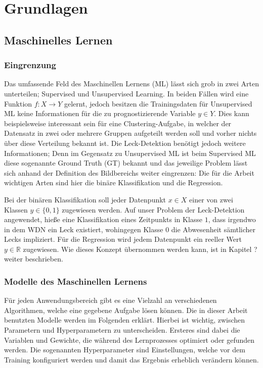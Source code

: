 \chapter{Grundlagen}

\section{Maschinelles Lernen}

\subsection*{Eingrenzung}

Das umfassende Feld des Maschinellen Lernens (ML) lässt sich grob in zwei Arten unterteilen;
 Supervised und Unsupervised Learning. In beiden Fällen wird eine Funktion $f: X \rightarrow Y$ gelernt,
 jedoch besitzen die Trainingsdaten für Unsupervised ML keine Informationen für die zu prognostizierende
 Variable $y \in Y$. Dies kann beispielsweise interessant sein für eine Clustering-Aufgabe, in welcher der
 Datensatz in zwei oder mehrere Gruppen aufgeteilt werden soll und vorher nichts über diese Verteilung bekannt
 ist. Die Leck-Detektion benötigt jedoch weitere Informationen; Denn im Gegensatz zu Unsupervised ML ist beim
 Supervised ML diese sogenannte Ground Truth (GT) bekannt und das jeweilige Problem lässt sich anhand der
 Definition des Bildbereichs weiter eingrenzen: Die für die Arbeit wichtigen Arten sind hier die binäre
 Klassifikation und die Regression.

Bei der binären Klassifikation soll jeder Datenpunkt $x \in X$ einer von zwei Klassen $y \in \{0, 1\}$ zugewiesen
 werden. Auf unser Problem der Leck-Detektion angewendet, hieße eine Klassifikation eines Zeitpunkts in
 Klasse $1$, dass irgendwo in dem WDN ein Leck existiert, wohingegen Klasse $0$ die Abwesenheit sämtlicher
 Lecks impliziert. Für die Regression wird jedem Datenpunkt ein reeller Wert $y \in \mathbb{R}$ zugewiesen.
Wie dieses Konzept übernommen werden kann, ist in Kapitel ? weiter beschrieben. 


\subsection*{Modelle des Maschinellen Lernens}

Für jeden Anwendungsbereich gibt es eine Vielzahl an verschiedenen Algorithmen, welche eine gegebene Aufgabe
 lösen können. Die in dieser Arbeit benutzten Modelle werden im Folgenden erklärt. Hierbei ist wichtig, zwischen
 Parametern und Hyperparametern zu unterscheiden. Ersteres sind dabei die Variablen und Gewichte, die während
 des Lernprozesses optimiert oder gefunden werden. Die sogenannten Hyperparameter sind Einstellungen, welche
 vor dem Training konfiguriert werden und damit das Ergebnis erheblich verändern können.


